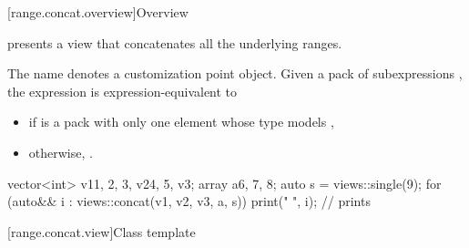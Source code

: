 [range.concat.overview]{Overview}

\pnum
{} presents a view that concatenates all the underlying ranges.

\pnum
The name  denotes
a customization point object.
Given a pack of subexpressions ,
the expression  is expression-equivalent to
\begin{itemize}
\item {} if  is a pack with only one element
whose type models ,
\item otherwise, .
\end{itemize}
\begin{example}
\begin{codeblock}
vector<int> v1{1, 2, 3}, v2{4, 5}, v3{};
array a{6, 7, 8};
auto s = views::single(9);
for (auto&& i : views::concat(v1, v2, v3, a, s)) {
  print("{} ", i);      // prints 
}
\end{codeblock}
\end{example}

[range.concat.view]{Class template }

